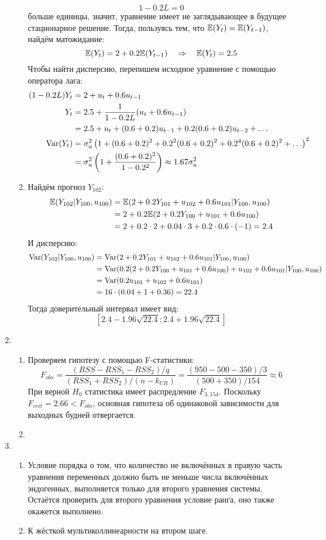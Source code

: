 \begin{enumerate}
\begin{enumerate}
\[
1 - 0.2 L = 0
\]
больше единицы, значит, уравнение имеет не заглядывающее в будущее стационарное решение.
Тогда, пользуясь тем, что $\mathbb{E}(Y_t) = \mathbb{E}(Y_{t-1})$, найдём матожидание:
\[
\mathbb{E}(Y_t) = 2 + 0.2\mathbb{E}(Y_{t-1}) \quad \Rightarrow \quad \mathbb{E}(Y_t) = 2.5
\]
Чтобы найти дисперсию, перепишем исходное уравнение с помощью оператора лага:
\begin{align*}
(1 - 0.2 L) Y_t &= 2 + u_t + 0.6 u_{t-1} \\
Y_t &= 2.5 + \frac{1}{1 - 0.2 L} (u_t + 0.6 u_{t-1}) \\
&= 2.5 + u_t + (0.6 + 0.2) u_{t-1} + 0.2(0.6 + 0.2) u_{t-2} + \ldots \\
\operatorname{Var}(Y_t) &= \sigma^2_u \left(1 + (0.6 + 0.2)^2 + 0.2^2 (0.6 + 0.2)^2 + 0.2^4 (0.6 + 0.2)^2 + \ldots\right)^2 \\
&= \sigma^2_u \left(1 +  \frac{(0.6 + 0.2)^2}{1 - 0.2^2} \right) \approx 1.67 \sigma^2_u
\end{align*}
\item Найдём прогноз $Y_{102}$:
\begin{align*}
\mathbb{E}(Y_{102} | Y_{100}, u_{100}) &= \mathbb{E}(2 + 0.2 Y_{101} + u_{102} + 0.6 u_{101} | Y_{100}, u_{100}) \\
&= 2 + 0.2 \mathbb{E}(2 + 0.2Y_{100} + u_{101} + 0.6 u_{100}) \\
&= 2 + 0.2 \cdot 2 + 0.04 \cdot 3 + 0.2 \cdot 0.6 \cdot (-1) = 2.4
\end{align*}
И дисперсию:
\begin{align*}
\operatorname{Var}(Y_{102} | Y_{100}, u_{100}) &= \operatorname{Var}(2 + 0.2 Y_{101} + u_{102} + 0.6 u_{101} | Y_{100}, u_{100}) \\
&= \operatorname{Var}(0.2(2 + 0.2Y_{100} + u_{101} + 0.6 u_{100}) + u_{102} + 0.6 u_{101} | Y_{100}, u_{100}) \\
&= \operatorname{Var}(0.2 u_{101} + u_{102} + 0.6 u_{101}) \\
&= 16 \cdot (0.04 + 1 + 0.36) = 22.4
\end{align*}
Тогда доверительный интервал имеет вид:
\[
\left[2.4 - 1.96 \sqrt{22.4}; 2.4 + 1.96 \sqrt{22.4} \right]
\]
\end{enumerate}
\item
\begin{enumerate}
\item Проверяем гипотезу с помощью F-статистики:
\[
F_{obs} = \frac{(RSS - RSS_1 - RSS_2) / q}{(RSS_1 + RSS_2) / (n - k_{UR})} = \frac{(950 - 500 - 350) / 3}{(500 + 350) / 154} \approx 6
\]
При верной $H_0$ статистика имеет распредление $F_{3, 154}$.
Поскольку $F_{crit} = 2.66 < F_{obs}$, основная гипотеза об одинаковой зависимости
для выходных будней отвергается.
\item
\end{enumerate}
\item
\begin{enumerate}
\item Условие порядка о том, что количество не включённых в правую часть
уравнения переменных должно быть не меньше числа включённых эндогенных, выполняется только
для второго уравнения системы.
Остаётся проверить для второго уравнения условие ранга,
оно также окажется выполнено.
\item К жёсткой мультиколлинеарности на втором шаге.


\end{enumerate}
\end{enumerate}
